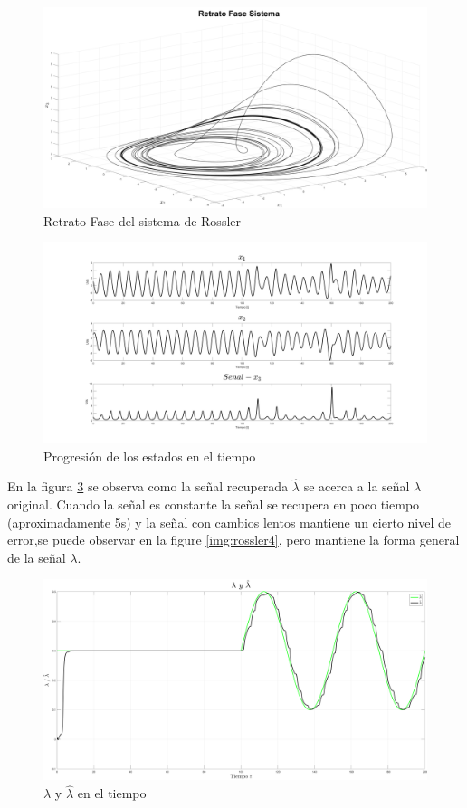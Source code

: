 \begin{figure}[H]
	\centering
	\includegraphics[width=150mm]{img/E2_RetratoFase.png}
	\caption{Retrato Fase del sistema de Rossler}
	\label{img:rossler1}
\end{figure}

\begin{figure}[H]
	\centering
	\includegraphics[width=150mm]{img/E2_Estados.png}
	\caption{Progresión de los estados en el tiempo}
	\label{img:rossler2}
\end{figure}

En la figura \ref{img:rossler3} se observa como la señal recuperada $\hat{\lambda}$ se acerca a la señal $\lambda$ original. Cuando la señal es constante la señal se recupera en poco tiempo (aproximadamente 5s) y la señal con cambios lentos mantiene un cierto nivel de error,se puede observar en la figure \ref{img:rossler4}, pero mantiene la forma general de la señal $\lambda$.

\begin{figure}[H]
	\centering
	\includegraphics[width=150mm]{img/E2_Lambda.png}
	\caption{$\lambda$ y $\hat{\lambda}$ en el tiempo}
	\label{img:rossler3}
\end{figure}

